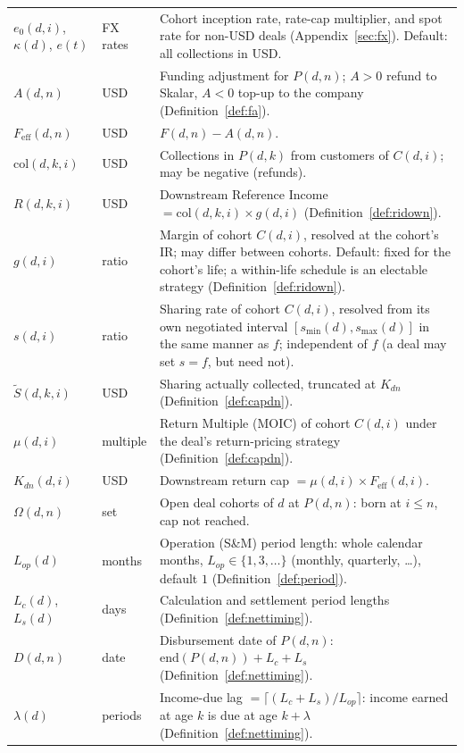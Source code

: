 \documentclass[11pt, a4paper]{article}
\theoremstyle{definition}
\newcommand{\col}{\mathrm{col}}                   %
\newcommand{\Stil}{\tilde{S}}                     %
\newcommand{\capdn}{K_{dn}}                       %
\newcommand{\OO}{\Omega}                          %
\begin{document}
\begin{longtable}{@{} L{3.0cm} L{3.4cm} L{8.4cm} @{}}
$e_0(d, i)$, $\kappa(d)$, $e(t)$ & FX rates & Cohort inception rate, rate-cap multiplier, and spot rate for non-USD deals (Appendix~\ref{sec:fx}). Default: all collections in USD. \\[3pt]
$A(d, n)$ & USD & Funding adjustment for $P(d,n)$; $A > 0$ refund to Skalar, $A < 0$ top-up to the company (Definition~\ref{def:fa}). \\[3pt]
$F_{\mathrm{eff}}(d, n)$ & USD & $F(d, n) - A(d, n)$. \\[3pt]
$\col(d, k, i)$ & USD & Collections in $P(d,k)$ from customers of $C(d, i)$; may be negative (refunds). \\[3pt]
$R(d, k, i)$ & USD & Downstream Reference Income $= \col(d,k,i) \times g(d,i)$ (Definition~\ref{def:ridown}). \\[3pt]
$g(d, i)$ & ratio & Margin of cohort $C(d,i)$, resolved at the cohort's IR; may differ between cohorts. Default: fixed for the cohort's life; a within-life schedule is an electable strategy (Definition~\ref{def:ridown}). \\[3pt]
$s(d, i)$ & ratio & Sharing rate of cohort $C(d,i)$, resolved from its own negotiated interval $[s_{\min}(d), s_{\max}(d)]$ in the same manner as $f$; independent of $f$ (a deal may set $s = f$, but need not). \\[3pt]
$\Stil(d, k, i)$ & USD & Sharing actually collected, truncated at $\capdn$ (Definition~\ref{def:capdn}). \\[3pt]
$\mu(d, i)$ & multiple & Return Multiple (MOIC) of cohort $C(d,i)$ under the deal's return-pricing strategy (Definition~\ref{def:capdn}). \\[3pt]
$\capdn(d, i)$ & USD & Downstream return cap $= \mu(d,i) \times F_{\mathrm{eff}}(d,i)$. \\[3pt]
$\OO(d, n)$ & set & Open deal cohorts of $d$ at $P(d,n)$: born at $i \leq n$, cap not reached. \\[3pt]
$L_{op}(d)$ & months & Operation (S\&M) period length: whole calendar months, $L_{op} \in \{1, 3, \dots\}$ (monthly, quarterly, \dots), default $1$ (Definition~\ref{def:period}). \\[3pt]
$L_c(d)$, $L_s(d)$ & days & Calculation and settlement period lengths (Definition~\ref{def:nettiming}). \\[3pt]
$D(d, n)$ & date & Disbursement date of $P(d,n)$: $\mathrm{end}(P(d,n)) + L_c + L_s$ (Definition~\ref{def:nettiming}). \\[3pt]
$\lambda(d)$ & periods & Income-due lag $= \lceil (L_c + L_s)/L_{op}\rceil$: income earned at age $k$ is due at age $k+\lambda$ (Definition~\ref{def:nettiming}). \\[3pt]

\end{longtable}
\end{document}

